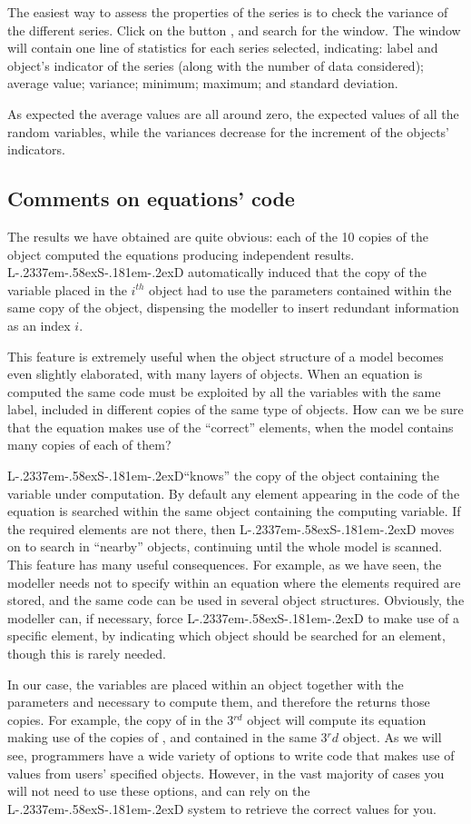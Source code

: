 \documentclass [11pt,a4paper] {book}
\def\LsD{{L\kern-.2337em\lower-.58ex\hbox{S}\kern-.181em\lower-.2ex\hbox{D}}\xspace}
\begin{document}
The easiest way to assess the properties of the series is to check the variance of the different series. Click on the button , and search for the  window. The window will contain one line of statistics for each series selected, indicating: label and object's indicator of the series (along with the number of data considered); average value; variance; minimum; maximum; and standard deviation.

As expected the average values are all around zero, the expected values of all the random variables, while the variances decrease for the increment of the objects' indicators.


\subsection{Comments on equations' code}
The results we have obtained are quite obvious: each of the 10 copies of the object
computed the equations producing independent results. \LsD automatically induced that the copy of the variable  placed in the $i^{th}$ object had to use the parameters contained within the same copy of the object, dispensing the modeller to insert redundant information as an index $i$.

This feature is extremely useful when the object structure of a model becomes even slightly elaborated, with many layers of objects. When an equation is computed the same code must be exploited by all the variables with the same label, included in different copies of the same type of objects. How can we be sure that the equation makes use of the ``correct'' elements, when the model contains many copies of each of them?

\LsD ``knows'' the copy of the object containing the variable under computation. By default any element appearing in the code of the equation is searched within the same object containing the computing variable. If the required elements are not there, then \LsD moves on to search in ``nearby'' objects, continuing until the whole model is scanned. This feature has many useful consequences. For example, as we have seen, the modeller needs not to specify within an equation where the elements required are stored, and the same code can be used in several object structures. Obviously, the modeller can, if necessary, force \LsD to make use of a specific element, by indicating which object should be searched for an element, though this is rarely needed.


In our case, the  variables are placed within an object together
with the parameters  and  necessary to compute them, and
therefore the  returns those copies. For example, the copy of  in
the 3$^{rd}$ object  will compute its equation making use of the copies of ,
 and  contained in the same 3$^rd$ object. As we will see,
programmers have a wide variety of options to write code that makes use of values from users' specified
objects. However, in the vast majority of cases you will not need to use these
options, and can rely on the \LsD system to retrieve the correct values for you.
\end{document}
